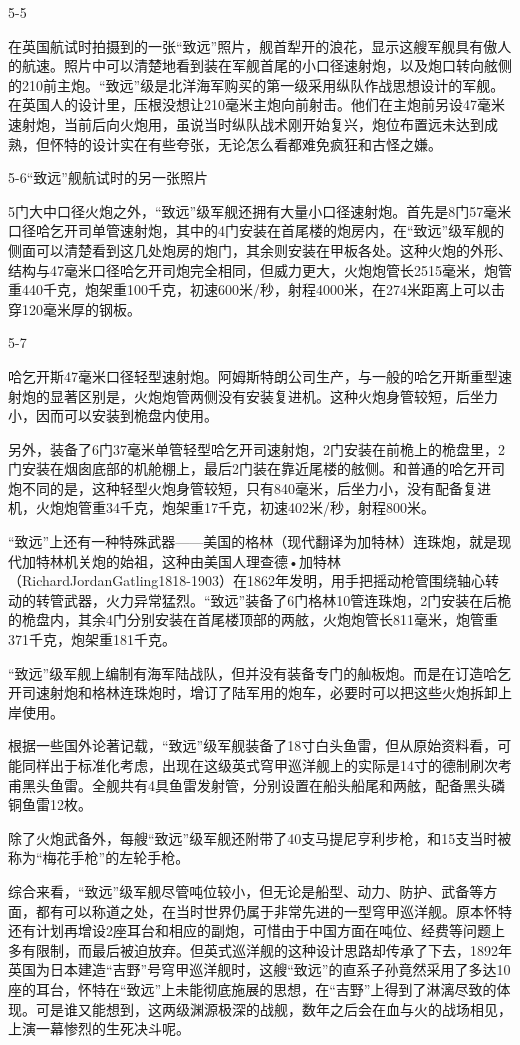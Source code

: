 \documentclass[12pt,UTF8]{ctexbook}
\begin{document}
5-5

在英国航试时拍摄到的一张“致远”照片，舰首犁开的浪花，显示这艘军舰具有傲人的航速。照片中可以清楚地看到装在军舰首尾的小口径速射炮，以及炮口转向舷侧的210前主炮。“致远”级是北洋海军购买的第一级采用纵队作战思想设计的军舰。在英国人的设计里，压根没想让210毫米主炮向前射击。他们在主炮前另设47毫米速射炮，当前后向火炮用，虽说当时纵队战术刚开始复兴，炮位布置远未达到成熟，但怀特的设计实在有些夸张，无论怎么看都难免疯狂和古怪之嫌。

5-6“致远”舰航试时的另一张照片

5门大中口径火炮之外，“致远”级军舰还拥有大量小口径速射炮。首先是8门57毫米口径哈乞开司单管速射炮，其中的4门安装在首尾楼的炮房内，在“致远”级军舰的侧面可以清楚看到这几处炮房的炮门，其余则安装在甲板各处。这种火炮的外形、结构与47毫米口径哈乞开司炮完全相同，但威力更大，火炮炮管长2515毫米，炮管重440千克，炮架重100千克，初速600米/秒，射程4000米，在274米距离上可以击穿120毫米厚的钢板。

5-7

哈乞开斯47毫米口径轻型速射炮。阿姆斯特朗公司生产，与一般的哈乞开斯重型速射炮的显著区别是，火炮炮管两侧没有安装复进机。这种火炮身管较短，后坐力小，因而可以安装到桅盘内使用。

另外，装备了6门37毫米单管轻型哈乞开司速射炮，2门安装在前桅上的桅盘里，2门安装在烟囱底部的机舱棚上，最后2门装在靠近尾楼的舷侧。和普通的哈乞开司炮不同的是，这种轻型火炮身管较短，只有840毫米，后坐力小，没有配备复进机，火炮炮管重34千克，炮架重17千克，初速402米/秒，射程800米。

“致远”上还有一种特殊武器——美国的格林（现代翻译为加特林）连珠炮，就是现代加特林机关炮的始祖，这种由美国人理查德•加特林（RichardJordanGatling1818-1903）在1862年发明，用手把摇动枪管围绕轴心转动的转管武器，火力异常猛烈。“致远”装备了6门格林10管连珠炮，2门安装在后桅的桅盘内，其余4门分别安装在首尾楼顶部的两舷，火炮炮管长811毫米，炮管重371千克，炮架重181千克。

“致远”级军舰上编制有海军陆战队，但并没有装备专门的舢板炮。而是在订造哈乞开司速射炮和格林连珠炮时，增订了陆军用的炮车，必要时可以把这些火炮拆卸上岸使用。

根据一些国外论著记载，“致远”级军舰装备了18寸白头鱼雷，但从原始资料看，可能同样出于标准化考虑，出现在这级英式穹甲巡洋舰上的实际是14寸的德制刷次考甫黑头鱼雷。全舰共有4具鱼雷发射管，分别设置在船头船尾和两舷，配备黑头磷铜鱼雷12枚。

除了火炮武备外，每艘“致远”级军舰还附带了40支马提尼亨利步枪，和15支当时被称为“梅花手枪”的左轮手枪。

综合来看，“致远”级军舰尽管吨位较小，但无论是船型、动力、防护、武备等方面，都有可以称道之处，在当时世界仍属于非常先进的一型穹甲巡洋舰。原本怀特还有计划再增设2座耳台和相应的副炮，可惜由于中国方面在吨位、经费等问题上多有限制，而最后被迫放弃。但英式巡洋舰的这种设计思路却传承了下去，1892年英国为日本建造“吉野”号穹甲巡洋舰时，这艘“致远”的直系子孙竟然采用了多达10座的耳台，怀特在“致远”上未能彻底施展的思想，在“吉野”上得到了淋漓尽致的体现。可是谁又能想到，这两级渊源极深的战舰，数年之后会在血与火的战场相见，上演一幕惨烈的生死决斗呢。
\end{document}
